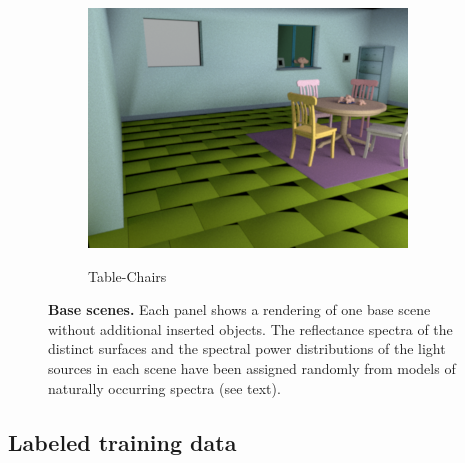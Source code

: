 \documentclass{jov}
\begin{document}
\begin{figure}[t]
\begin{subfigure}[b]{0.22 \textwidth}
        \caption{Table-Chairs}    
        \includegraphics[width=\textwidth]{../FiguresDraft4/Figure3/Figure3_c.png}
        \label{fig:baseSceneTableChairs}
    \end{subfigure}
    \caption{{\bf Base scenes.} Each panel shows a rendering of one base scene without additional inserted objects.  The reflectance spectra of the distinct surfaces and the spectral power distributions of the light sources in each scene have been assigned randomly from models of naturally occurring spectra (see text).}\label{fig:baseScenes}
\end{figure}

\subsection{Labeled training data} \label{method:VirtualWorld}
\end{document}
